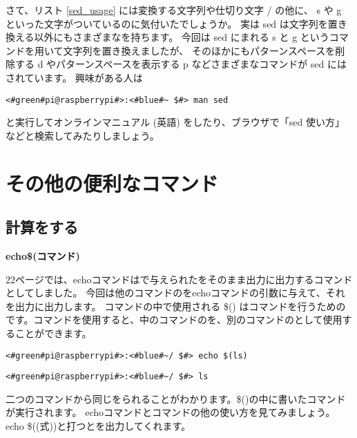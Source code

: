 さて、リスト \ref{sed_usage} には変換する文字列や仕切り文字 / の他に、
s や g といった文字がついているのに気付いたでしょうか。
実は sed は文字列を置き換える以外にもさまざまなを持ちます。
今回は sed にまれる s と g というコマンドを用いて文字列を置き換えましたが、
そのほかにもパターンスペースを削除する d やパターンスペースを表示する p などさまざまなコマンドが sed にはされています。
興味がある人は

\begin{lstlisting}
<#green#pi@raspberrypi#>:<#blue#~ $#> man sed
\end{lstlisting}

と実行してオンラインマニュアル (英語) をしたり、ブラウザで「sed 使い方」などと検索してみたりしましょう。

\newpage
\section{その他の便利なコマンド}
\subsection{計算をする}
\noindent
{\bf echo\textvisiblespace\$(コマンド) }

22ページでは、echoコマンドはで与えられたをそのまま出力に出力するコマンドとしてしました。
今回は他のコマンドのをechoコマンドの引数に与えて、それを出力に出力します。
コマンドの中で使用される \$() はコマンドを行うためのです。コマンドを使用すると、中のコマンドのを、別のコマンドのとして使用することができます。
\begin{lstlisting}[caption=echo コマンド置換を使った例1, label=cmdsbs:echo]
<#green#pi@raspberrypi#>:<#blue#~/ $#> echo $(ls)
\end{lstlisting} 

\begin{lstlisting}[caption=lsコマンドの出力, label=cmdsbs:ls]
<#green#pi@raspberrypi#>:<#blue#~/ $#> ls
\end{lstlisting}

二つのコマンドから同じをられることがわかります。\$()の中に書いたコマンドが実行されます。
echoコマンドとコマンドの他の使い方を見てみましょう。echo \$((式))と打つとを出力してくれます。


